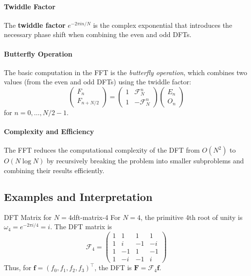 \paragraph{Twiddle Factor} The \textbf{twiddle factor} $e^{-2\pi i n / N}$ is the complex exponential that introduces the necessary phase shift when combining the even and odd DFTs.

\paragraph{Butterfly Operation} The basic computation in the FFT is the \emph{butterfly operation}, which combines two values (from the even and odd DFTs) using the twiddle factor:
\[
    \begin{pmatrix}
        F_n \\
        F_{n+N/2}
    \end{pmatrix}
    =
    \begin{pmatrix}
        1 & \mathcal{F}_N^n  \\
        1 & -\mathcal{F}_N^n
    \end{pmatrix}
    \begin{pmatrix}
        E_n \\
        O_n
    \end{pmatrix}
\]
for $n = 0, \ldots, N/2-1$.

\paragraph{Complexity and Efficiency}
The FFT reduces the computational complexity of the DFT from $O(N^2)$ to $O(N \log N)$ by recursively breaking the problem into smaller subproblems and combining their results efficiently.

\subsection{Examples and Interpretation}

\begin{example}{DFT Matrix for $N=4$}{dft-matrix-4}
    For $N = 4$, the primitive 4th root of unity is $\omega_4 = e^{-2\pi i / 4} = i$. The DFT matrix is
    \[
        \mathcal{F}_4 =
        \begin{pmatrix}
            1 & 1  & 1  & 1  \\
            1 & i  & -1 & -i \\
            1 & -1 & 1  & -1 \\
            1 & -i & -1 & i
        \end{pmatrix}
    \]
    Thus, for $\mathbf{f} = (f_0, f_1, f_2, f_3)^\top$, the DFT is $\mathbf{F} = \mathcal{F}_4 \mathbf{f}$.
\end{example}

